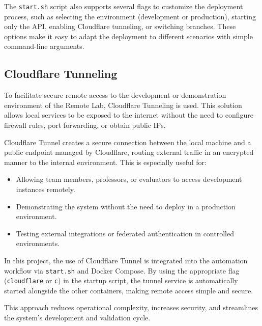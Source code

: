 The \texttt{start.sh} script also supports several flags to customize the deployment process, such as selecting the environment (development or production), starting only the API, enabling Cloudflare tunneling, or switching branches. These options make it easy to adapt the deployment to different scenarios with simple command-line arguments.

\subsection{Cloudflare Tunneling} \label{subsec:cloudflare_tunneling}

To facilitate secure remote access to the development or demonstration environment of the Remote Lab, Cloudflare Tunneling is used. This solution allows local services to be exposed to the internet without the need to configure firewall rules, port forwarding, or obtain public IPs.

Cloudflare Tunnel creates a secure connection between the local machine and a public endpoint managed by Cloudflare, routing external traffic in an encrypted manner to the internal environment. This is especially useful for:

\begin{itemize}
    \item Allowing team members, professors, or evaluators to access development instances remotely.
    \item Demonstrating the system without the need to deploy in a production environment.
    \item Testing external integrations or federated authentication in controlled environments.
\end{itemize}

In this project, the use of Cloudflare Tunnel is integrated into the automation workflow via \texttt{start.sh} and Docker Compose. By using the appropriate flag (\texttt{cloudflare} or \texttt{c}) in the startup script, the tunnel service is automatically started alongside the other containers, making remote access simple and secure.

This approach reduces operational complexity, increases security, and streamlines the system's development and validation cycle.


